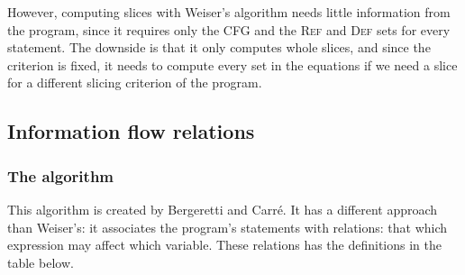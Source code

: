 \documentclass[oneside,12pt,a4paper]{book}
\begin{document}
However, computing slices with Weiser's algorithm needs little information from the program, since it requires only the CFG and the \textsc{Ref} and \textsc{Def} sets for every statement.
The downside is that it only computes whole slices, and since the criterion is fixed, it needs to compute every set in the equations if we need a slice for a different slicing criterion of the program.

\subsection{Information flow relations}
\subsubsection{The algorithm}
This algorithm is created by Bergeretti and Carré\cite{information-flow}. It has a different approach than Weiser's: it associates the program's statements with relations: that which expression may affect which variable. These relations has the definitions in the table below.
\clearpage
\end{document}
